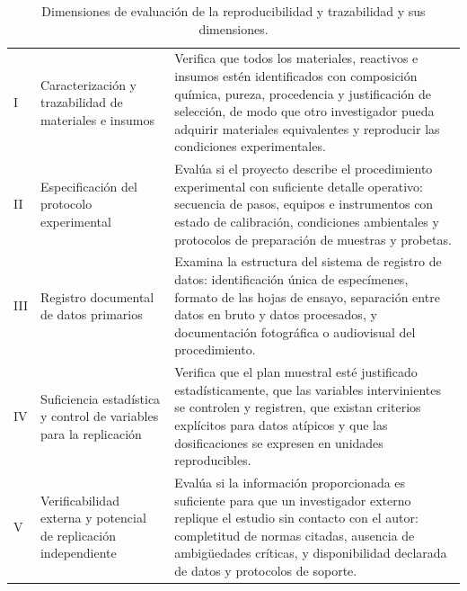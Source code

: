 \begin{table}[htbp]
\centering
\scriptsize
\caption{Dimensiones de evaluación de la reproducibilidad y trazabilidad y sus dimensiones.}
\label{tab:dim-reproducibilidad}
\begin{tabularx}{\textwidth}{|C{0.8cm}|L{4.5cm}|X|}
\hline
{}
 &  &  \\ \hline
I & Caracterización y trazabilidad de materiales e insumos & Verifica que todos los materiales, reactivos e insumos estén identificados con composición química, pureza, procedencia y justificación de selección, de modo que otro investigador pueda adquirir materiales equivalentes y reproducir las condiciones experimentales. \\ \hline
{}
II & Especificación del protocolo experimental & Evalúa si el proyecto describe el procedimiento experimental con suficiente detalle operativo: secuencia de pasos, equipos e instrumentos con estado de calibración, condiciones ambientales y protocolos de preparación de muestras y probetas. \\ \hline
III & Registro documental de datos primarios & Examina la estructura del sistema de registro de datos: identificación única de especímenes, formato de las hojas de ensayo, separación entre datos en bruto y datos procesados, y documentación fotográfica o audiovisual del procedimiento. \\ \hline
{}
IV & Suficiencia estadística y control de variables para la replicación & Verifica que el plan muestral esté justificado estadísticamente, que las variables intervinientes se controlen y registren, que existan criterios explícitos para datos atípicos y que las dosificaciones se expresen en unidades reproducibles. \\ \hline
V & Verificabilidad externa y potencial de replicación independiente & Evalúa si la información proporcionada es suficiente para que un investigador externo replique el estudio sin contacto con el autor: completitud de normas citadas, ausencia de ambigüedades críticas, y disponibilidad declarada de datos y protocolos de soporte. \\ \hline
\end{tabularx}
\end{table}

